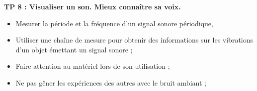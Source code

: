 
\renewcommand{\thesection}{\textcolor{red}{Partie \Roman{section} -}}
\renewcommand{\thesubsection}{\textcolor{red}{\Roman{section}.\arabic{subsection}}}
\renewcommand{\thesubsubsection}{\textcolor{red}{\Roman{section}.\arabic{subsection}.\alph{subsubsection}}}

\setcounter{section}{0}
\setcounter{document}{0}
\sndEnTeteTPHuit

\begin{center}
\begin{mdframed}[style=titr, leftmargin=60pt, rightmargin=60pt, innertopmargin=7pt, innerbottommargin=7pt, innerrightmargin=8pt, innerleftmargin=8pt]

\begin{center}
\large{\textbf{TP 8 : Visualiser un son. Mieux connaître sa voix.
}}
\end{center}
\end{mdframed}
\end{center}



\begin{tcolorbox}[colback=blue!5!white,colframe=blue!75!black,title=Objectifs de la séance :]
\begin{itemize}
    \item Mesurer la période et la fréquence d'un signal sonore périodique,
    \item Utiliser une chaîne de mesure pour obtenir des informations sur les vibrations d’un objet émettant un signal sonore ;
\end{itemize}
\end{tcolorbox}

\begin{tcolorbox}[colback=red!5!white,colframe=red!75!black,title= Consignes :]
\begin{itemize}
    \item Faire attention au matériel lors de son utilisation ;
    \item Ne pas gêner les expériences des autres avec le bruit ambiant ;
\end{itemize}
\end{tcolorbox}

